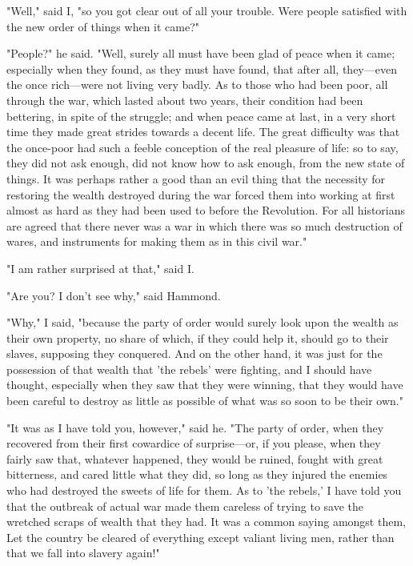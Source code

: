 "Well," said I, "so you got clear out of all your trouble. Were people
satisfied with the new order of things when it came?"

"People?" he said. "Well, surely all must have been glad of peace when
it came; especially when they found, as they must have found, that after
all, they---even the once rich---were not living very badly. As to those
who had been poor, all through the war, which lasted about two years,
their condition had been bettering, in spite of the struggle; and when
peace came at last, in a very short time they made great strides towards
a decent life. The great difficulty was that the once-poor had such a
feeble conception of the real pleasure of life: so to say, they did not
ask enough, did not know how to ask enough, from the new state of
things. It was perhaps rather a good than an evil thing that the
necessity for restoring the wealth destroyed during the war forced them
into working at first almost as hard as they had been used to before the
Revolution. For all historians are agreed that there never was a war in
which there was so much destruction of wares, and instruments for making
them as in this civil war."

"I am rather surprised at that," said I.

"Are you? I don't see why," said Hammond.

"Why," I said, "because the party of order would surely look upon the
wealth as their own property, no share of which, if they could help it,
should go to their slaves, supposing they conquered. And on the other
hand, it was just for the possession of that wealth that 'the rebels'
were fighting, and I should have thought, especially when they saw that
they were winning, that they would have been careful to destroy as
little as possible of what was so soon to be their own."

"It was as I have told you, however," said he. "The party of order, when
they recovered from their first cowardice of surprise---or, if you
please, when they fairly saw that, whatever happened, they would be
ruined, fought with great bitterness, and cared little what they did, so
long as they injured the enemies who had destroyed the sweets of life
for them. As to 'the rebels,' I have told you that the outbreak of
actual war made them careless of trying to save the wretched scraps of
wealth that they had. It was a common saying amongst them, Let the
country be cleared of everything except valiant living men, rather than
that we fall into slavery again!"

